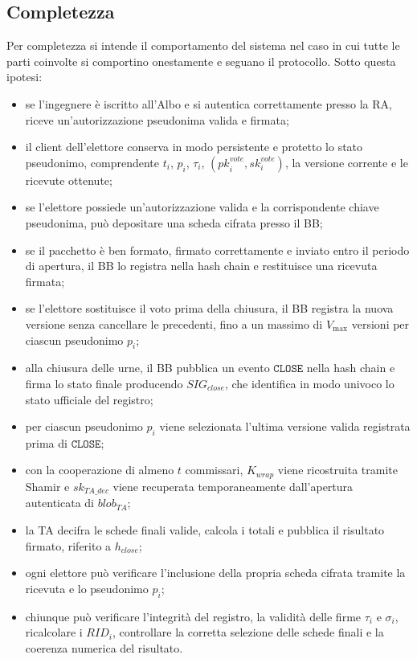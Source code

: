 \documentclass[12pt,a4paper]{article}
\newcommand{\pk}{\mathit{pk}}
\newcommand{\sk}{\mathit{sk}}
\begin{document}
\subsection{Completezza}

Per completezza si intende il comportamento del sistema nel caso in cui tutte le parti coinvolte si comportino onestamente e seguano il protocollo. Sotto questa ipotesi:

\begin{itemize}
\item se l'ingegnere \`e iscritto all'Albo e si autentica correttamente presso la RA, riceve un'autorizzazione pseudonima valida e firmata;
\item il client dell'elettore conserva in modo persistente e protetto lo stato pseudonimo, comprendente $t_i$, $p_i$, $\tau_i$, $(\pk_i^{\mathit{vote}}, \sk_i^{\mathit{vote}})$, la versione corrente e le ricevute ottenute;
\item se l'elettore possiede un'autorizzazione valida e la corrispondente chiave pseudonima, pu\`o depositare una scheda cifrata presso il BB;
\item se il pacchetto \`e ben formato, firmato correttamente e inviato entro il periodo di apertura, il BB lo registra nella hash chain e restituisce una ricevuta firmata;
\item se l'elettore sostituisce il voto prima della chiusura, il BB registra la nuova versione senza cancellare le precedenti, fino a un massimo di $V_{\max}$ versioni per ciascun pseudonimo $p_i$;
\item alla chiusura delle urne, il BB pubblica un evento $\texttt{CLOSE}$ nella hash chain e firma lo stato finale producendo $\mathit{SIG}_{\mathit{close}}$, che identifica in modo univoco lo stato ufficiale del registro;
\item per ciascun pseudonimo $p_i$ viene selezionata l'ultima versione valida registrata prima di $\texttt{CLOSE}$;
\item con la cooperazione di almeno $t$ commissari, $K_{\mathit{wrap}}$ viene ricostruita tramite Shamir e $\sk_{\mathit{TA\_dec}}$ viene recuperata temporaneamente dall'apertura autenticata di $\mathit{blob}_{\mathit{TA}}$;
\item la TA decifra le schede finali valide, calcola i totali e pubblica il risultato firmato, riferito a $h_{\mathit{close}}$;
\item ogni elettore pu\`o verificare l'inclusione della propria scheda cifrata tramite la ricevuta e lo pseudonimo $p_i$;
\item chiunque pu\`o verificare l'integrit\`a del registro, la validit\`a delle firme $\tau_i$ e $\sigma_i$, ricalcolare i $\mathit{RID}_i$, controllare la corretta selezione delle schede finali e la coerenza numerica del risultato.
\end{itemize}
\end{document}
